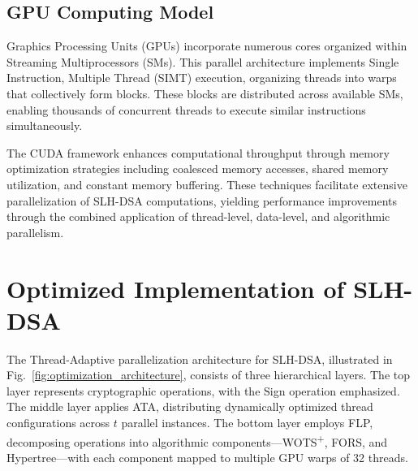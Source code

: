 \documentclass[journal]{IEEEtran}
\begin{document}
\subsection{GPU Computing Model}

Graphics Processing Units (GPUs) incorporate numerous cores organized within Streaming Multiprocessors (SMs). This parallel architecture implements Single Instruction, Multiple Thread (SIMT) execution, organizing threads into warps that collectively form blocks. These blocks are distributed across available SMs, enabling thousands of concurrent threads to execute similar instructions simultaneously.

The CUDA framework enhances computational throughput through memory optimization strategies including coalesced memory accesses, shared memory utilization, and constant memory buffering. These techniques facilitate extensive parallelization of SLH-DSA computations, yielding performance improvements through the combined application of thread-level, data-level, and algorithmic parallelism.

\section{Optimized Implementation of SLH-DSA}\label{sec:implementation}

The Thread-Adaptive parallelization architecture for SLH-DSA, illustrated in Fig.~\ref{fig:optimization_architecture}, consists of three hierarchical layers. The top layer represents cryptographic operations, with the Sign operation emphasized. The middle layer applies ATA, distributing dynamically optimized thread configurations across $t$ parallel instances. The bottom layer employs FLP, decomposing operations into algorithmic components—WOTS\textsuperscript{+}, FORS, and Hypertree—with each component mapped to multiple GPU warps of 32 threads.
\end{document}
